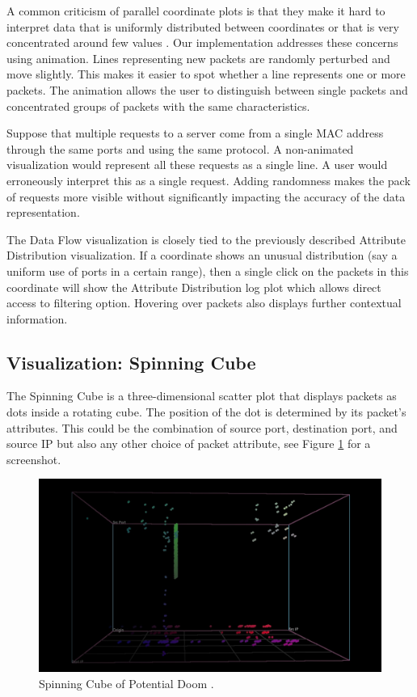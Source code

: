 A common criticism of parallel coordinate plots is that they make it hard to interpret data that is
uniformly distributed between coordinates or that is very concentrated around few values
\cite{marty2009applied}. Our implementation addresses these concerns using animation. Lines
representing new packets are randomly perturbed and move slightly. This makes it easier to spot
whether a line represents one or more packets. The animation allows the user to distinguish between
single packets and concentrated groups of packets with the same characteristics.

Suppose that multiple requests to a server come from a single MAC address through the same ports and
using the same protocol. A non-animated visualization would represent all these requests as a single
line. A user would erroneously interpret this as a single request. Adding randomness makes the pack
of requests more visible without significantly impacting the accuracy of the data representation.

The Data Flow visualization is closely tied to the previously described Attribute Distribution
visualization. If a coordinate shows an unusual distribution (say a uniform use of ports in a
certain range), then a single click on the packets in this coordinate will show the Attribute
Distribution log plot which allows direct access to filtering option. Hovering over packets also
displays further contextual information.

\subsection{Visualization: Spinning Cube}
%
The Spinning Cube is a three-dimensional scatter plot that displays packets as dots inside a
rotating cube. The position of the dot is determined by its packet's attributes. This could be the
combination of source port, destination port, and source IP but also any other choice of packet
attribute, see Figure \ref{fig:cube} for a screenshot.

\begin{figure}[htb]
   \centering
   \includegraphics[width=\linewidth]{materials/cube.jpg}
   \caption[Spinning Cube]{\label{fig:cube}
         Spinning Cube of Potential Doom \cite{lau2004spinning}.}
\end{figure}

